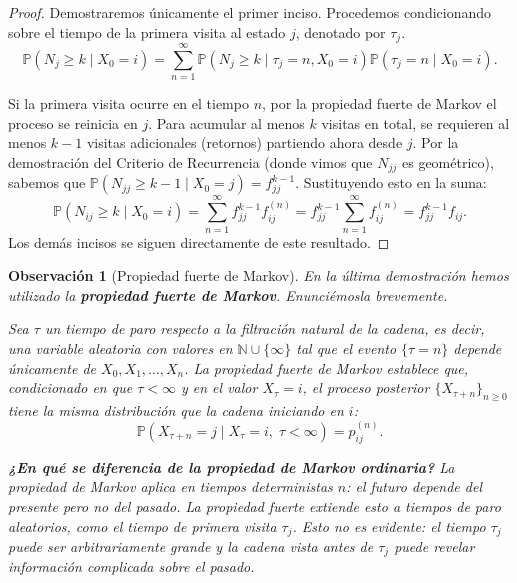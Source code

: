 \documentclass[12pt]{book}
\newtheorem{remark}{Observación}[chapter]
\begin{document}
\begin{proof}
Demostraremos únicamente el primer inciso. Procedemos condicionando sobre el tiempo de la primera visita al estado $j$, denotado por $\tau_j$.
\begin{equation} \label{prop_fuerte_de_markov_needed}
\mathbb{P}(N_{j} \ge k \mid X_0 = i) = \sum_{n=1}^\infty \mathbb{P}(N_{j} \ge k \mid \tau_j = n, X_0 = i) \mathbb{P}(\tau_j = n \mid X_0 = i).    
\end{equation}

Si la primera visita ocurre en el tiempo $n$, por la propiedad fuerte de Markov el proceso se reinicia en $j$. Para acumular al menos $k$ visitas en total, se requieren al menos $k-1$ visitas adicionales (retornos) partiendo ahora desde $j$. Por la demostración del Criterio de Recurrencia (donde vimos que $N_{jj}$ es geométrico), sabemos que $\mathbb{P}(N_{jj} \ge k-1 \mid X_0 = j) = f_{jj}^{k-1}$.
Sustituyendo esto en la suma:
\[
\mathbb{P}(N_{ij} \ge k \mid X_0 = i) = \sum_{n=1}^\infty f_{jj}^{k-1} f_{ij}^{(n)} = f_{jj}^{k-1} \sum_{n=1}^\infty f_{ij}^{(n)} = f_{jj}^{k-1} f_{ij}.
\]
Los demás incisos se siguen directamente de este resultado.
\end{proof}

\begin{remark}[Propiedad fuerte de Markov]
En la última demostración hemos utilizado la \textbf{propiedad fuerte de Markov}. Enunciémosla brevemente.

Sea $\tau$ un \emph{tiempo de paro} respecto a la filtración natural de la cadena, es decir, una variable aleatoria con valores en $\mathbb{N} \cup \{\infty\}$ tal que el evento $\{\tau = n\}$ depende únicamente de $X_0, X_1, \dots, X_n$. La propiedad fuerte de Markov establece que, condicionado en que $\tau < \infty$ y en el valor $X_\tau = i$, el proceso posterior $\{X_{\tau+n}\}_{n \ge 0}$ tiene la misma distribución que la cadena iniciando en $i$:
\[
\mathbb{P}(X_{\tau+n} = j \mid X_\tau = i,\; \tau < \infty) = p_{ij}^{(n)}.
\]

\textbf{¿En qué se diferencia de la propiedad de Markov ordinaria?} La propiedad de Markov aplica en tiempos \emph{deterministas} $n$: el futuro depende del presente pero no del pasado. La propiedad fuerte extiende esto a tiempos de paro \emph{aleatorios}, como el tiempo de primera visita $\tau_j$. Esto no es evidente: el tiempo $\tau_j$ puede ser arbitrariamente grande y la cadena vista antes de $\tau_j$ puede revelar información complicada sobre el pasado.

\end{remark}
\end{document}
